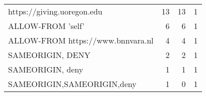\begin{tabular}{lrrr}
              https://giving.uoregon.edu &       13 &          13 &      1 \\
                       ALLOW-FROM 'self' &        6 &           6 &      1 \\
       ALLOW-FROM https://www.bnnvara.nl &        4 &           4 &      1 \\
                        SAMEORIGIN, DENY &        2 &           2 &      1 \\
                        SAMEORIGIN, deny &        1 &           1 &      1 \\
              SAMEORIGIN,SAMEORIGIN,deny &        1 &           0 &      1 \\
\bottomrule
\end{tabular}
